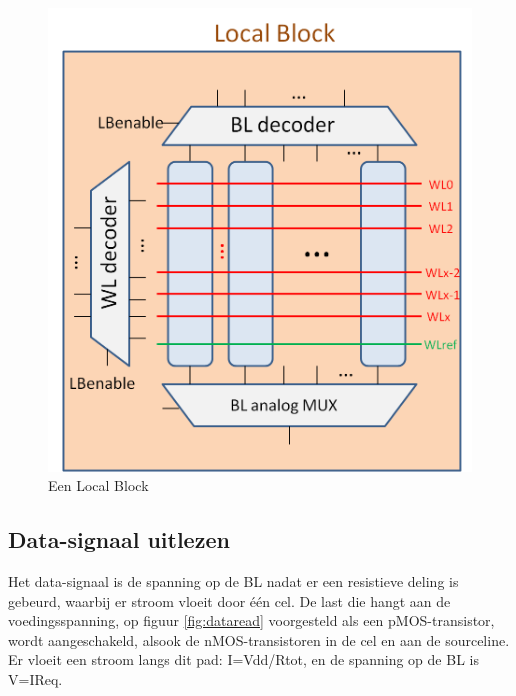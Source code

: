\begin{figure}
  \centering
  \includegraphics[scale=0.3]{../fig/hfdstk-architecture-localblock.png}
  \caption{Een Local Block}
  \label{fig:LB}
\end{figure}

\subsection{Data-signaal uitlezen}
Het data-signaal is de spanning op de BL nadat er een resistieve deling is gebeurd, waarbij er stroom vloeit door één cel. De last die hangt aan de voedingsspanning, op figuur \ref{fig:dataread} voorgesteld als een pMOS-transistor, wordt aangeschakeld, alsook de nMOS-transistoren in de cel en aan de sourceline. Er vloeit een stroom langs dit pad: I=Vdd/Rtot, en de spanning op de BL is V=IReq.

